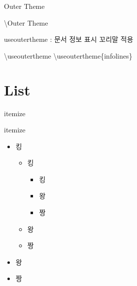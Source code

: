 \documentclass[9pt,blue,xcolor=pdftex,dvipsnames,table,handout,notes]{beamer}
\begin{document}
		\begin{frame}[t]{Outer Theme}

			\begin{block} {\textbackslash Outer Theme}
			\end{block}
		\end{frame}



		\begin{frame}{useoutertheme : 문서 정보 표시 꼬리말 적용}

			\begin{block} {\textbackslash useoutertheme}
			\textbackslash useoutertheme\{infolines\}
			\end{block}
		\end{frame}





		\section{List}

		\begin{frame}[plain]
		\centering
		\end{frame}


		\begin{frame}[t]{itemize}

			\begin{block} {itemize}
				\begin{itemize}
				\item 킹
						\begin{itemize}
						\item 킹
								\begin{itemize}
								\item 킹
								\item 왕
								\item 짱
								\end{itemize}
						\item 왕
						\item 짱
						\end{itemize}
				\item 왕
				\item 짱
				\end{itemize}
			\end{block}

		\end{frame}
\end{document}
